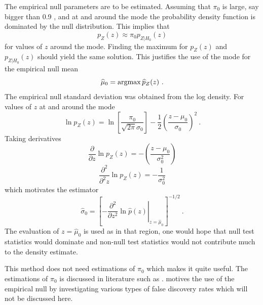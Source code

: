 The empirical null parameters are to be estimated. Assuming that $\pi_0$ is large, say bigger than 0.9 \citep{efron2004large}, and at and around the mode the probability density function is dominated by the null distribution. This implies that
\begin{equation}
  p_{Z}(z) \approx \pi_0 p_{Z|H_0}(z)
\end{equation}
for values of $z$ around the mode. Finding the maximum for $p_{Z}(z)$ and $p_{Z|H_0}(z)$ should yield the same solution. This justifies the use of the mode for the empirical null mean \citep{efron2004large}
\begin{equation}
  \widehat{\mu}_0 = \argmax\widehat{p}_Z(z) \ .
\end{equation} 
The empirical null standard deviation was obtained from the log density. For values of $z$ at and around the mode
\begin{equation}
  \ln p_{Z}(z) = 
  \ln\left[
    \dfrac{\pi_0}{\sqrt{2\pi}{\sigma}_0}
  \right]
  -\dfrac{1}{2}
  \left(
    \dfrac{z-{\mu}_0}{{\sigma}_0}
  \right)^2
  \ .
\end{equation}
Taking derivatives
\begin{equation}
  \dfrac{\partial}{\partial z} \ln p_{Z}(z) =
  -\left(
    \dfrac{
      z-{\mu}_0
    }
    {
      {\sigma}_0^2
    }
  \right)
\end{equation}
\begin{equation}
  \dfrac{\partial^2}{\partial^2 z} \ln p_{Z}(z) =
  -\dfrac{
    1
  }
  {
    {\sigma}_0^2
  }
\end{equation}
which motivates the estimator \citep{efron2004large}
\begin{equation}
  \widehat{\sigma}_0 = \left[
    \left.
      -\dfrac{\partial^2}{\partial z^2}\ln\widehat{p}(z)
    \right|_{z=\widehat{\mu}_0}
  \right]^{-1/2}
  \ .
\end{equation}
The evaluation of $z=\widehat{\mu}_0$ is used as in that region, one would hope that null test statistics would dominate and non-null test statistics would not contribute much to the density estimate.

This method does not need estimations of $\pi_0$ which makes it quite useful. The estimations of $\pi_0$ is discussed in literature such as \cite{benjamini2000adaptive, pounds2003estimating, storey2003statistical, pounds2004improving, langaas2005estimating, durnez2014posthoc}. \cite{efron2004large} motives the use of the empirical null by investigating various types of false discovery rates \citep{storey2002direct, storey2003positive, efron2002empirical, efron2007size} which will not be discussed here.

